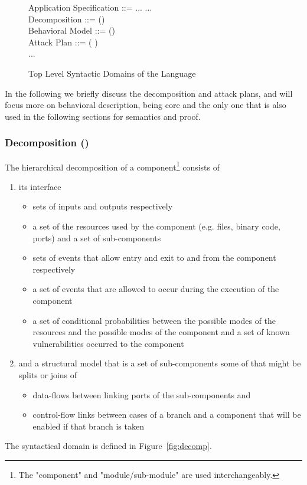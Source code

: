 \documentclass[conference]{IEEEtran}
\begin{document}
\begin{figure}[ht]
\centering
Application Specification \hspace*{0.9cm}  ::= ...   ...
\\\hspace*{-0.1cm} Decomposition \hspace*{2.2cm}  ::=   () 
\\Behavioral Model \hspace*{1.8cm}  ::=   () 
\\\hspace*{0.3cm} Attack Plan \hspace*{2.6cm}  ::=     ( ) \\
\hspace*{2.8cm}...
\caption{Top Level Syntactic Domains of the Language}
\label{fig:domains}
\end{figure}

In the following we briefly discuss the decomposition and attack plans, and will focus more on behavioral description, being core and the only one that is also used in the following sections for semantics and proof.
\subsubsection*{Decomposition ()}
The hierarchical decomposition  of a component\footnote{The "component" and "module/sub-module" are used interchangeably.} consists of 
\begin{enumerate}
\item its interface
\begin{itemize}
\item sets of inputs and outputs respectively
\item a set of the resources used by the component (e.g. files, binary code, ports) and a set of sub-components
\item sets of events that allow entry and exit to and from the component respectively
\item a set of events that are allowed to occur during the execution of the component
\item a set of conditional probabilities between the possible modes of the resources and the possible modes of the component and
a set of known vulnerabilities occurred to the component
\end{itemize}
\item and a structural model that is a set of sub-components some of that might be splits or joins of
\begin{itemize}
\item data-flows between linking ports of the sub-components and
\item control-flow links between cases of a branch and a component that will be enabled if that branch is taken
\end{itemize}
\end{enumerate}
The syntactical domain  is defined in Figure~\ref{fig:decomp}.
\end{document}
